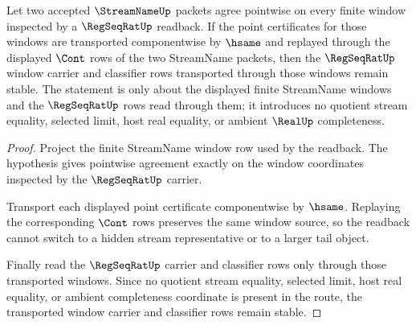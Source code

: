 \begin{theorem}
\label{thm:regseqrat-window-stability}
Let two accepted $\StreamNameUp$ packets agree pointwise on every finite window inspected by a $\RegSeqRatUp$ readback. If the point certificates for those windows are transported componentwise by $\hsame$ and replayed through the displayed $\Cont$ rows of the two StreamName packets, then the $\RegSeqRatUp$ window carrier and classifier rows transported through those windows remain stable. The statement is only about the displayed finite StreamName windows and the $\RegSeqRatUp$ rows read through them; it introduces no quotient stream equality, selected limit, host real equality, or ambient $\RealUp$ completeness.
\end{theorem}
\begin{proof}
Project the finite StreamName window row used by the readback. The hypothesis gives pointwise agreement exactly on the window coordinates inspected by the $\RegSeqRatUp$ carrier.

Transport each displayed point certificate componentwise by $\hsame$. Replaying the corresponding $\Cont$ rows preserves the same window source, so the readback cannot switch to a hidden stream representative or to a larger tail object.

Finally read the $\RegSeqRatUp$ carrier and classifier rows only through those transported windows. Since no quotient stream equality, selected limit, host real equality, or ambient completeness coordinate is present in the route, the transported window carrier and classifier rows remain stable.
\end{proof}
